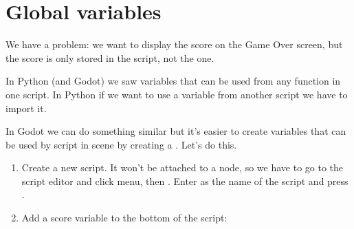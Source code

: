 \documentclass[letterpaper,10pt,english]{sphinxmanual}
\begin{document}
\section{Global variables}
\label{\detokenize{tutorial:global-variables}}
\sphinxAtStartPar
We have a problem: we want to display the score on the Game Over screen,
but the score is only stored in the  script, not the
 one.

\sphinxAtStartPar
In Python (and Godot) we saw  variables that can be used from
any function in one script. In Python if we want to use a variable from
another script we have to import it.

\sphinxAtStartPar
In Godot we can do something similar but it’s easier to create variables
that can be used by  script in  scene by creating a . Let’s do this.
\begin{enumerate}
%
\item {} 
\sphinxAtStartPar
Create a new script. It won’t be attached to a node, so we have to go
to the script editor and click  menu, then .
Enter  as the name of the script and press .

\item {} 
\sphinxAtStartPar
Add a score variable to the bottom of the script:

\end{enumerate}
\end{document}
